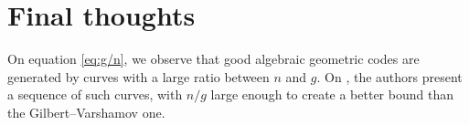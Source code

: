 \documentclass[11pt]{amsart}
\theoremstyle{definition}
\theoremstyle{example}
\theoremstyle{remark}
\numberwithin{equation}{section}
\begin{document}
\section{Final thoughts} \label{s:tvz} On equation \eqref{eq:g/n}, we observe that good algebraic geometric codes are generated by curves with a large ratio between $n$ and $g$. On \cite{TVZ82}, the authors present a sequence of such curves, with $n/g$ large enough to create a better bound than the Gilbert--Varshamov one.

\printbibliography
\end{document}

